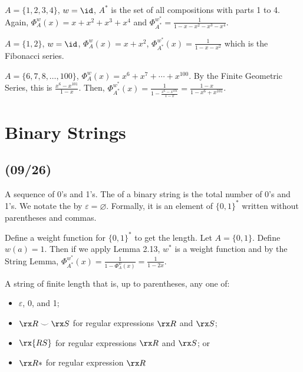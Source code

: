 \begin{example}
  $A = \{1,2,3,4\}$, $w = \id$, $A^*$ is the set of all compositions with parts 1 to 4.
  Again, $\Phi_A^w(x) = x + x^2 + x^3 + x^4$ and $\Phi_{A^*}^{w^*} = \frac{1}{1-x-x^2-x^3-x^4}$.
\end{example}

\begin{example}
  $A = \{1,2\}$, $w = \id$, $\Phi_A^w(x) = x + x^2$,
  $\Phi_{A^*}^{w^*}(x)=\frac{1}{1-x-x^2}$ which is the Fibonacci series.
\end{example}

\begin{example}
  $A = \{6,7,8,\dotsc,100\}$, $\Phi_A^w(x) = x^6 + x^7 + \dotsb + x^{100}$.
  By the Finite Geometric Series, this is $\frac{x^6-x^{101}}{1-x}$.
  Then, $\Phi_{A^*}^{w^*}(x) = \frac{1}{1-\frac{x^6-x^{101}}{1-x}} = \frac{1-x}{1-x^6+x^{101}}$.
\end{example}

\chapter{Binary Strings}

\section{(09/26)}

\begin{defn}
  A sequence of 0's and 1's.
  The  of a binary string is the total number of 0's and 1's.
  We notate the  by $\varepsilon = \varnothing$.
  Formally, it is an element of $\{0,1\}^*$ written without parentheses and commas.
\end{defn}

\begin{remark}
  Define a weight function for $\{0,1\}^*$ to get the length.
  Let $A = \{0,1\}$. Define $w(a) = 1$.
  Then if we apply Lemma 2.13, $w^*$ is a weight function
  and by the String Lemma, $\Phi_{A^*}^{w^*}(x) = \frac{1}{1-\Phi_A^w(x)} = \frac{1}{1-2x}$.
\end{remark}

\begin{defn}
  A string of finite length that is, up to parentheses, any one of:
  \begin{itemize}[nosep]
    \item $\varepsilon$, 0, and 1;
    \item $\rx R \smile \rx S$ for regular expressions $\rx R$ and $\rx S$;
    \item $\rx{RS}$ for regular expressions $\rx R$ and $\rx S$; or
    \item $\rx R*$ for regular expression $\rx R$
  \end{itemize}
\end{defn}

